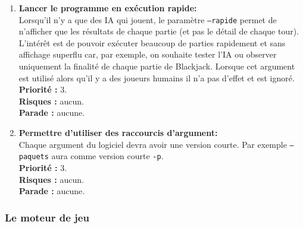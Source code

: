 \documentclass{article}
\newcommand{\code}[1]{\colorbox{light-gray}{\texttt{#1}}}
\begin{document}
\begin{enumerate}
    \item \textbf{Lancer le programme en exécution rapide:} \\
    Lorsqu'il n'y a que des IA qui jouent, le paramètre \code{--rapide} permet de n'afficher que les résultats de chaque partie (et pas le détail de chaque tour). L'intérêt est de pouvoir exécuter beaucoup de parties rapidement et sans affichage superflu car, par exemple, on souhaite tester l'IA ou observer uniquement la finalité de chaque partie de Blackjack.
    Lorsque cet argument est utilisé alors qu'il y a des joueurs humains il n'a pas d'effet et est ignoré.\\
    \textbf{Priorité :} 3. \\
    \textbf{Risques :} aucun. \\
    \textbf{Parade :} aucune.
 
    \item \textbf{Permettre d'utiliser des raccourcis d'argument:} \\ 
    Chaque argument du logiciel devra avoir une version courte. Par exemple \code{--paquets} aura comme version courte \code{-p}. \\
    \textbf{Priorité :} 3. \\
    \textbf{Risques :} aucun. \\
    \textbf{Parade :} aucune.

\end{enumerate}


\subsubsection{Le moteur de jeu}
\end{document}
